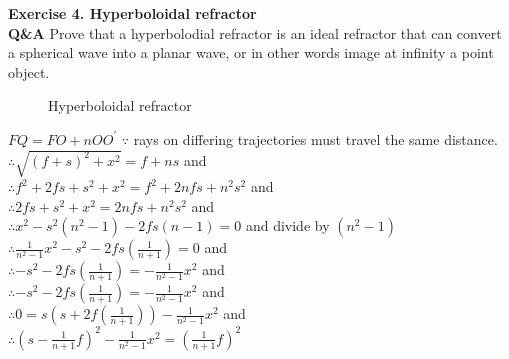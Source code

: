 \documentclass[main.tex]{subfiles}
\begin{document}
\textbf{Exercise 4. Hyperboloidal refractor}\\

\textbf{Q\&A} Prove that a hyperbolodial refractor is an ideal refractor that can convert a spherical wave into a planar wave, or in other words image at infinity a point object.\\

\begin{figure}
\centering{}
\caption{Hyperboloidal refractor}
\label{fig:4}
\end{figure}

$FQ = FO + nOO^{\prime}$ $\because$ rays on differing trajectories must travel the same distance.\\

$\therefore \sqrt{(f+s)^2 + x^2} = f + ns$  and\\ 

$\therefore  f^2+ 2fs + s^2 + x^2 = f^2 + 2nfs + n^2s^2$  and\\ 

$\therefore 2fs + s^2 + x^2 = 2nfs + n^2s^2$  and\\ 

$\therefore x^2  - s^2(n^2 - 1) - 2fs(n- 1) = 0$  and divide by $(n^2 - 1)$ \\ 

$\therefore \frac{1}{n^2 - 1} x^2  - s^2 - 2fs(\frac{1}{n + 1}) = 0$  and \\ 

$\therefore  - s^2 - 2fs(\frac{1}{n + 1}) = -\frac{1}{n^2 - 1} x^2 $  and \\ 

$\therefore  - s^2 - 2fs(\frac{1}{n + 1}) = -\frac{1}{n^2 - 1} x^2 $  and \\ 

$\therefore  0 = s(s + 2f(\frac{1}{n + 1})) -\frac{1}{n^2 - 1} x^2 $  and \\

$\therefore \left(s-\frac{1}{n+1}f \right)^2 - \frac{1}{n^2 - 1}x^2 = \left(\frac{1}{n+1}f \right)^2$ \\
\end{document}
